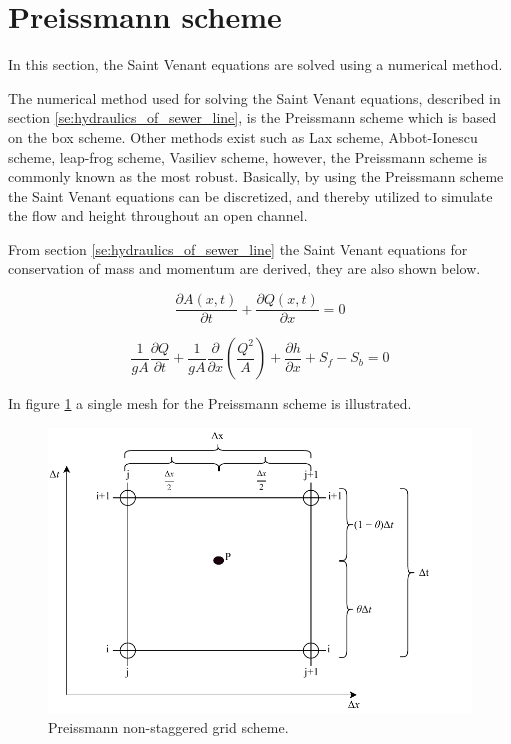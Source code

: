 ﻿\section{Preissmann scheme}\label{subse:preissmann_scheme}
In this section, the Saint Venant equations are solved using a numerical method.


The numerical method used for solving the Saint Venant equations, described in section \ref{se:hydraulics_of_sewer_line}, is the Preissmann scheme which is based on the box scheme. Other methods exist such as Lax scheme, Abbot-Ionescu scheme, leap-frog scheme, Vasiliev scheme, however, the Preissmann scheme is commonly known as the most robust. Basically, by using the Preissmann scheme the Saint Venant equations can be discretized, and thereby utilized to simulate the flow and height throughout an open channel.

From section \ref{se:hydraulics_of_sewer_line} the Saint Venant equations for conservation of mass and momentum are derived, they are also shown below.

\begin{equation}\label{eq:saintbernard_mass_preiss}
\frac{\partial A(x,t)}{\partial t} + \frac{\partial Q(x,t)}{\partial x}=0
\end{equation}

\begin{equation}\label{eq:saintbernard_momentum_preiss}
\frac{1}{gA} \frac{\partial Q}{\partial t} +\frac{1}{gA}\frac{\partial}{\partial x} \left( \frac{Q^2}{A} \right) + \frac{\partial h}{\partial x} + S_f - S_b = 0
\end{equation}


In figure \ref{fig:preissmann_grid_scheme} a single mesh for the Preissmann scheme is illustrated.

\begin{figure}[H]
\centering
\includegraphics[width=.6\textwidth]{report/simulation/pictures/preissmann_scheme.pdf}
\caption{Preissmann non-staggered grid scheme.}
\label{fig:preissmann_grid_scheme}
\end{figure}

